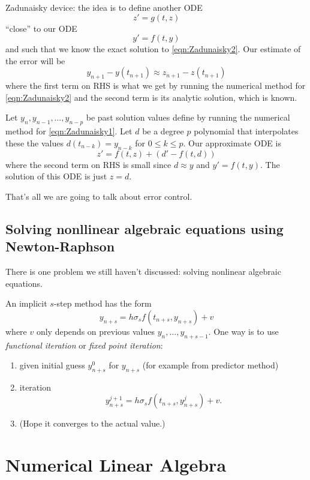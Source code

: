 \documentclass[a4paper]{article}
\begin{document}
Zadunaisky device: the idea is to define another ODE
\begin{equation}
  \label{eqn:Zadunaisky2}
  z' = g(t, z)
  \tag{\(\ast\)}
\end{equation}
``close'' to our ODE
\begin{equation}
  \label{eqn:Zadunaisky1}
  y' = f(t, y)
  \tag{\(\ast\ast\)}
\end{equation}
and such that we know the exact solution to \eqref{eqn:Zadunaisky2}. Our estimate of the error will be
\[
  y_{n + 1} - y(t_{n + 1}) \approx z_{n + 1} - z(t_{n + 1})
\]
where the first term on RHS is what we get by running the numerical method for \eqref{eqn:Zadunaisky2} and the second term is its analytic solution, which is known.

Let \(y_n, y_{n - 1}, \dots, y_{n - p}\) be past solution values define by running the numerical method for \eqref{eqn:Zadunaisky1}. Let \(d\) be a degree \(p\) polynomial that interpolates these the values \(d(t_{n - k}) = y_{n - k}\) for \(0 \leq k \leq p\). Our approximate ODE is
\[
  z' = f(t, z) + (d' - f(t, d))
\]
where the second term on RHS is small since \(d \approx y\) and \(y' = f(t, y)\). The solution of this ODE is just \(z = d\).

That's all we are going to talk about error control.

\subsection{Solving nonllinear algebraic equations using Newton-Raphson}

There is one problem we still haven't discussed: solving nonlinear algebraic equations.

An implicit \(s\)-step method has the form
\[
  y_{n + s} = h \sigma_s f(t_{n + s}, y_{n + s}) + v
\]
where \(v\) only depends on previous values \(y_n, \dots, y_{n + s - 1}\). One way is to use \emph{functional iteration} or \emph{fixed point iteration}:
\begin{enumerate}
\item given initial guess \(y_{n + s}^0\) for \(y_{n + s}\) (for example from predictor method)
\item iteration
  \[
    y_{n + s}^{j + 1} = h \sigma_s f(t_{n + s}, y_{n + s}^j) + v.
  \]
\item (Hope it converges to the actual value.)
\end{enumerate}

\section{Numerical Linear Algebra}
\end{document}
